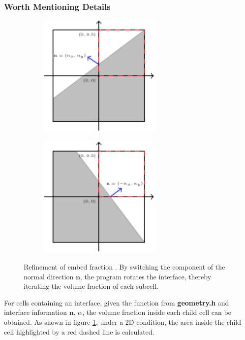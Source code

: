 \subsubsection{Worth Mentioning Details}
\begin{figure}[ht]
    \centering
    \begin{subfigure}[b]{0.45\textwidth}
        \centering
        \includegraphics[height=6cm]{./image/embed-tree-h/fraction_refine2D1.pdf}
        \subcaption{}
        \label{fig:embed-tree-2Drefine1}
    \end{subfigure}
    \begin{subfigure}[b]{0.45\textwidth}
        \centering
        \includegraphics[height=6cm]{./image/embed-tree-h/fraction_refine2D2.pdf}
        \subcaption{}
        \label{fig:embed-tree-2Drefine2}
    \end{subfigure}
    \caption{Refinement of embed fraction . By switching the component of the normal direction $\mathbf{n}$, the program rotates the interface, thereby iterating the volume fraction of each subcell.}
    \label{fig:embed-tree-2Drefine}
\end{figure}
For cells containing an interface, given the function  from \textbf{geometry.h} and interface information $\mathbf{n}$, $\alpha$, the volume fraction inside each child cell can be obtained. As shown in figure \ref{fig:embed-tree-2Drefine1}, under a 2D condition, the area inside the child cell highlighted by a red dashed line is calculated.

